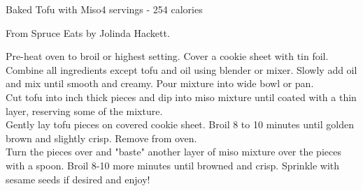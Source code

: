 \begin{recipe}{Baked Tofu with Miso}{4 servings - 254 calories}{}

\freeform From Spruce Eats by Jolinda Hackett.


Pre-heat oven to broil or highest setting. Cover a cookie sheet with tin foil. Combine all ingredients except tofu and oil using blender or mixer. Slowly add oil and mix until smooth and creamy. Pour mixture into wide bowl or pan.\\

Cut tofu into  inch thick pieces and dip into miso mixture until coated with a thin layer, reserving some of the mixture.\\

Gently lay tofu pieces on covered cookie sheet. Broil 8 to 10 minutes until golden brown and slightly crisp. Remove from oven.\\

Turn the pieces over and "baste" another layer of miso mixture over the pieces with a spoon. Broil 8-10 more minutes until browned and crisp. Sprinkle with sesame seeds if desired and enjoy!

\end{recipe}